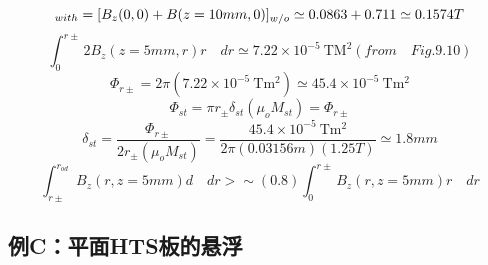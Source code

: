 \begin{equation}%
[B_{z}(0,0)]_{with}=[B_{z}(0,0)+B(z=10mm,0)]_{w/o}\\
\simeq0.0863+0.711\simeq0.1574T
\end{equation}
\begin{equation}%
\int_{0}^{r\pm}2B_{z}(z=5mm,r)r\quad dr\simeq7.22\times10^{-5}\ \mathrm{TM^{2}}(from\quad Fig.9.10)
\end{equation}
\begin{equation}%
\Phi_{r\pm}=2\pi(7.22\times10^{-5}\ \mathrm{Tm^{2}})\simeq45.4\times10^{-5}\ \mathrm{Tm^{2}}
\end{equation}
\begin{equation}%
\Phi_{st}=\pi r_{\pm}\delta_{st}(\mu_{o}M_{st})=\Phi_{r\pm}
\end{equation}
\begin{equation}%
\delta_{st}=\frac{\Phi_{r\pm}}{2r_{\pm}(\mu_{o}M_{st})}=\frac{45.4\times10^{-5}\ \mathrm{Tm^{2}}}{2\pi(0.03156m)(1.25T)}\simeq1.8mm
\end{equation}
\begin{equation}%
\int_{r\pm}^{r_{od}}B_{z}(r,z=5mm)d\quad dr>\sim(0.8)\int_{0}^{r\pm}B_{z}(r,z=5mm)r\quad dr
\end{equation}



\subsection{例C：平面HTS板的悬浮}

